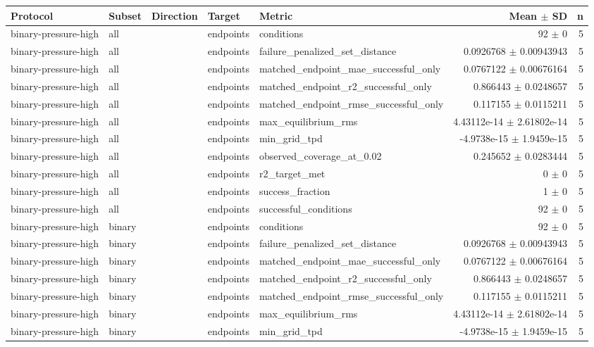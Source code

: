\begin{tabular}{lllllrr}
Protocol & Subset & Direction & Target & Metric & Mean $\pm$ SD & n \\
\hline
binary-pressure-high & all &  & endpoints & conditions & 92 $\pm$ 0 & 5 \\
binary-pressure-high & all &  & endpoints & failure_penalized_set_distance & 0.0926768 $\pm$ 0.00943943 & 5 \\
binary-pressure-high & all &  & endpoints & matched_endpoint_mae_successful_only & 0.0767122 $\pm$ 0.00676164 & 5 \\
binary-pressure-high & all &  & endpoints & matched_endpoint_r2_successful_only & 0.866443 $\pm$ 0.0248657 & 5 \\
binary-pressure-high & all &  & endpoints & matched_endpoint_rmse_successful_only & 0.117155 $\pm$ 0.0115211 & 5 \\
binary-pressure-high & all &  & endpoints & max_equilibrium_rms & 4.43112e-14 $\pm$ 2.61802e-14 & 5 \\
binary-pressure-high & all &  & endpoints & min_grid_tpd & -4.9738e-15 $\pm$ 1.9459e-15 & 5 \\
binary-pressure-high & all &  & endpoints & observed_coverage_at_0.02 & 0.245652 $\pm$ 0.0283444 & 5 \\
binary-pressure-high & all &  & endpoints & r2_target_met & 0 $\pm$ 0 & 5 \\
binary-pressure-high & all &  & endpoints & success_fraction & 1 $\pm$ 0 & 5 \\
binary-pressure-high & all &  & endpoints & successful_conditions & 92 $\pm$ 0 & 5 \\
binary-pressure-high & binary &  & endpoints & conditions & 92 $\pm$ 0 & 5 \\
binary-pressure-high & binary &  & endpoints & failure_penalized_set_distance & 0.0926768 $\pm$ 0.00943943 & 5 \\
binary-pressure-high & binary &  & endpoints & matched_endpoint_mae_successful_only & 0.0767122 $\pm$ 0.00676164 & 5 \\
binary-pressure-high & binary &  & endpoints & matched_endpoint_r2_successful_only & 0.866443 $\pm$ 0.0248657 & 5 \\
binary-pressure-high & binary &  & endpoints & matched_endpoint_rmse_successful_only & 0.117155 $\pm$ 0.0115211 & 5 \\
binary-pressure-high & binary &  & endpoints & max_equilibrium_rms & 4.43112e-14 $\pm$ 2.61802e-14 & 5 \\
binary-pressure-high & binary &  & endpoints & min_grid_tpd & -4.9738e-15 $\pm$ 1.9459e-15 & 5 \\

\end{tabular}
